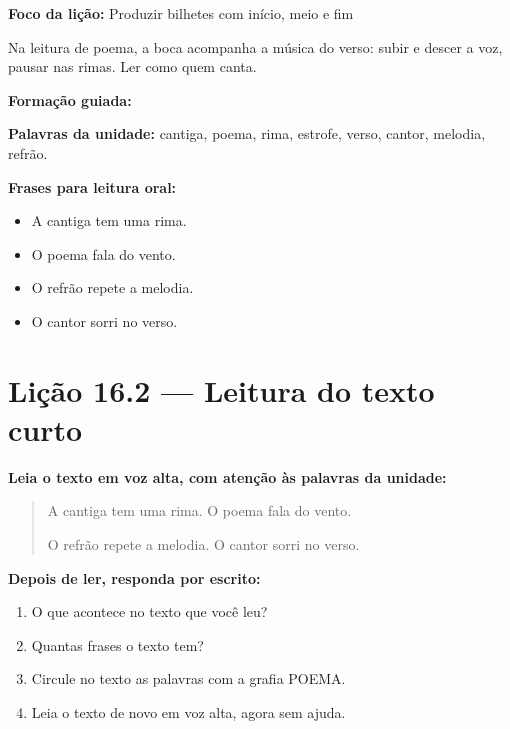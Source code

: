 \textbf{Foco da lição:} Produzir bilhetes com início, meio e fim


\begin{boquinha}
Na leitura de poema, a boca acompanha a música do verso: subir e descer a voz, pausar nas rimas. Ler como quem canta.
\end{boquinha}

\noindent\textbf{Formação guiada:}

\begin{center}
\end{center}

\noindent\textbf{Palavras da unidade:} cantiga, poema, rima, estrofe, verso, cantor, melodia, refrão.

\noindent\textbf{Frases para leitura oral:}
\begin{itemize}[leftmargin=1.6em]
  \item A cantiga tem uma rima.
  \item O poema fala do vento.
  \item O refrão repete a melodia.
  \item O cantor sorri no verso.
\end{itemize}

\section{Lição 16.2 --- Leitura do texto curto}

\noindent\textbf{Leia o texto em voz alta, com atenção às palavras da unidade:}


\begin{quote}
A cantiga tem uma rima. O poema fala do vento.

O refrão repete a melodia. O cantor sorri no verso.
\end{quote}

\textbf{Depois de ler, responda por escrito:}
\begin{enumerate}

  \item O que acontece no texto que você leu?
  \begin{center}
  \underline{\hspace{12cm}}
  \end{center}

  \item Quantas frases o texto tem?
  \begin{center}
  \underline{\hspace{12cm}}
  \end{center}

  \item Circule no texto as palavras com a grafia POEMA.

  \item Leia o texto de novo em voz alta, agora sem ajuda.

\end{enumerate}

